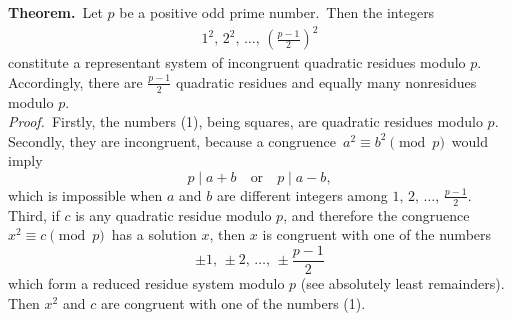 \documentclass[12pt]{article}
\theoremstyle{definition}
\begin{document}
\textbf{Theorem.}\, Let $p$ be a positive odd prime number.\, Then the integers
\begin{align}
1^2,\,2^2,\,\ldots,\,\left(\frac{p\!-\!1}{2}\right)^{\!2}
\end{align}
constitute a  representant system of incongruent quadratic residues modulo $p$.\, Accordingly, there are $\frac{p\!-\!1}{2}$ quadratic residues and equally many nonresidues modulo $p$.\\

\emph{Proof.}\, Firstly, the numbers (1), being squares, are quadratic residues modulo $p$.\, Secondly, they are incongruent, because a congruence \,$a^2 \equiv b^2 \pmod{p}$\, would imply
$$p \mid a\!+\!b \quad \mbox{or} \quad p \mid a\!-\!b,$$
which is impossible when $a$ and $b$ are different integers among $1,\,2,\,\ldots,\,\frac{p\!-\!1}{2}$.\, Third, if $c$ is any quadratic residue modulo $p$, and therefore the congruence \,$x^2 \equiv c \pmod{p}$\, has a solution $x$, then $x$ is congruent with one of the numbers
$$\pm1,\,\pm2,\,\ldots,\,\pm\frac{p\!-\!1}{2}$$
which form a reduced residue system modulo $p$ (see absolutely least remainders).\, Then $x^2$ and $c$ are congruent with one of the numbers (1).
\end{document}
